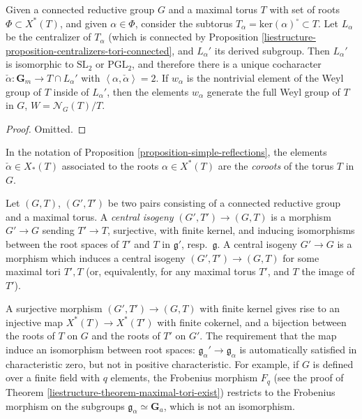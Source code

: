 \begin{proposition}
\label{proposition-simple-reflections}
 Given a connected reductive group $G$ and a maximal torus $T$ with set of roots $\Phi\subset X^*(T)$, and given $\alpha\in \Phi$, consider the subtorus $T_\alpha=\text{ker}(\alpha)^\circ\subset T$. Let $L_\alpha$ be the centralizer of $T_\alpha$ (which is connected by Proposition \ref{liestructure-proposition-centralizers-tori-connected}, and $L_\alpha'$ its derived subgroup. Then $L_\alpha'$ is isomorphic to $\text{SL}_2$ or $\text{PGL}_2$, and therefore there is a unique cocharacter $\check\alpha:\mathbf G_m\to T\cap L_{\alpha}'$ with $\left< \alpha, \check\alpha\right>=2$. If $w_\alpha$ is the nontrivial element of the Weyl group of $T$ inside of $L_\alpha'$, then the elements $w_\alpha$ generate the full Weyl group of $T$ in $G$, $W = \mathcal N_G(T)/T$.
\end{proposition}

\begin{proof}
 Omitted.
\end{proof}

\begin{definition}
 \label{definition-coroots-group}
In the notation of Proposition \ref{proposition-simple-reflections}, the elements $\check\alpha\in X_*(T)$ associated to the roots $\alpha\in X^*(T)$ are the {\it coroots} of the torus $T$ in $G$.
\end{definition}


\begin{definition}
\label{definition-central-isogeny}
 Let $(G,T)$, $(G',T')$ be two pairs consisting of a connected reductive group and a maximal torus. A {\it central isogeny} $(G',T')\to (G,T)$ is a morphism $G'\to G$ sending $T'\to T$, surjective, with finite kernel, and inducing isomorphisms between the root spaces of $T'$ and $T$ in $\mathfrak g'$, resp.\ $\mathfrak g$. A central isogeny $G'\to G$ is a morphism  which induces a central isogeny $(G',T')\to (G,T)$ for some maximal tori $T', T$ (or, equivalently, for any maximal torus $T'$, and $T$ the image of $T'$). 
\end{definition}

\begin{remark}
 \label{remark-on-central-isogenies}
A surjective morphism $(G',T')\to (G,T)$ with finite kernel gives rise to an injective map $X^*(T)\to X^*(T')$ with finite cokernel, and a bijection between the roots of $T$ on $G$ and the roots of $T'$ on $G'$. The requirement that the map induce an isomorphism between root spaces: $\mathfrak g_\alpha'\to \mathfrak g_\alpha$ is automatically satisfied in characteristic zero, but not in positive characteristic. For example, if $G$ is defined over a finite field with $q$ elements, the Frobenius morphism $F_q$ (see the proof of Theorem \ref{liestructure-theorem-maximal-tori-exist}) restricts to the Frobenius morphism on the subgroups $\mathfrak g_\alpha\simeq \mathbf G_a$, which is not an isomorphism.
\end{remark}



